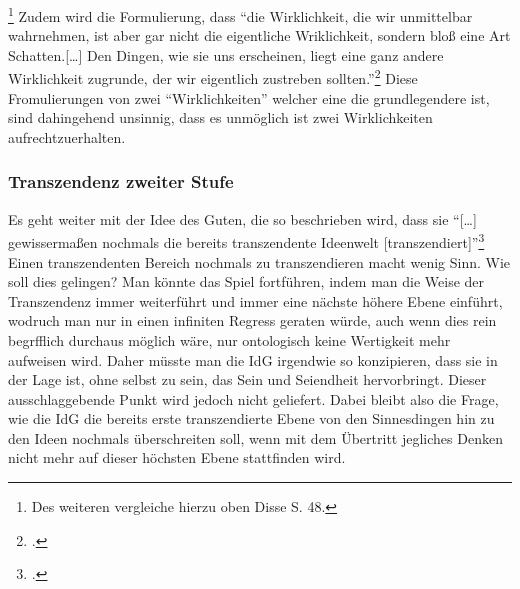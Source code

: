 \footnote{Des weiteren vergleiche hierzu oben Disse S. 48.}
Zudem wird die Formulierung, dass \enquote{die Wirklichkeit, die wir unmittelbar wahrnehmen, ist aber gar nicht die eigentliche Wriklichkeit, sondern bloß eine Art Schatten.[\dots] Den Dingen, wie sie uns erscheinen, liegt eine ganz andere Wirklichkeit zugrunde, der wir eigentlich zustreben sollten.}\footcite[][S. 23]{DisseMetaphysik}
Diese Fromulierungen von zwei \enquote{Wirklichkeiten} welcher eine die grundlegendere ist, sind dahingehend unsinnig, dass es unmöglich ist zwei Wirklichkeiten aufrechtzuerhalten.

\subsubsection{Transzendenz zweiter Stufe}
Es geht weiter mit der Idee des Guten, die so beschrieben wird, dass sie \enquote{[\dots] gewissermaßen nochmals die bereits transzendente Ideenwelt [transzendiert]}\footcite[vgl.][S. 50]{DisseMetaphysik}
Einen transzendenten Bereich nochmals zu transzendieren macht wenig Sinn. Wie soll dies gelingen? 
Man könnte das Spiel fortführen, indem man die Weise der Transzendenz immer weiterführt und immer eine nächste höhere Ebene einführt, wodruch man nur in einen infiniten Regress geraten würde, auch wenn dies rein begrfflich durchaus möglich wäre, nur ontologisch keine Wertigkeit mehr aufweisen wird. Daher müsste man die IdG irgendwie so konzipieren, dass sie in der Lage ist, ohne selbst zu sein, das Sein und Seiendheit hervorbringt. Dieser ausschlaggebende Punkt wird jedoch nicht geliefert. Dabei bleibt also die Frage, wie die IdG die bereits erste transzendierte Ebene von den Sinnesdingen hin zu den Ideen nochmals überschreiten soll, wenn mit dem Übertritt jegliches Denken nicht mehr auf dieser höchsten Ebene stattfinden wird. 

